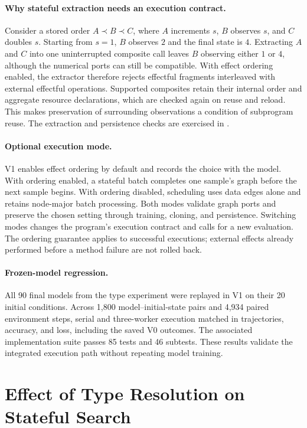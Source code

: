 \paragraph{Why stateful extraction needs an execution contract.}
Consider a stored order $A\prec B\prec C$, where $A$ increments $s$,
$B$ observes $s$, and $C$ doubles $s$. Starting from $s=1$, $B$ observes $2$
and the final state is $4$. Extracting $A$ and $C$ into one uninterrupted
composite call leaves $B$ observing either $1$ or $4$, although the numerical
ports can still be compatible. With effect ordering enabled, the extractor
therefore rejects effectful
fragments interleaved with external effectful operations. Supported composites
retain their internal order and aggregate resource declarations, which are
checked again on reuse and reload. This makes preservation of surrounding
observations a condition of subprogram reuse. The extraction and persistence
checks are exercised in .

\paragraph{Optional execution mode.}
V1 enables effect ordering by default and records the choice with the model.
With ordering enabled, a stateful batch completes one sample's graph before
the next sample begins. With ordering disabled, scheduling uses data edges
alone and retains node-major batch processing. Both modes validate graph ports
and preserve the chosen setting through training, cloning, and persistence.
Switching modes changes the program's execution contract and calls for a new
evaluation. The ordering guarantee applies to successful executions; external
effects already performed before a method failure are not rolled back.

\paragraph{Frozen-model regression.}
All 90 final models from the type experiment were replayed in V1 on their 20
initial conditions. Across 1,800 model--initial-state pairs and 4,934 paired
environment steps, serial and three-worker execution matched in trajectories,
accuracy, and loss, including the saved V0 outcomes. The associated implementation
suite passes 85 tests and 46 subtests. These results validate the integrated
execution path without repeating model training.

\section{Effect of Type Resolution on Stateful Search}
\label{app:revision_types}

